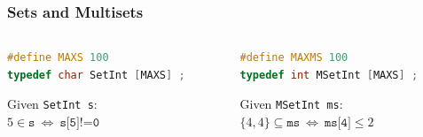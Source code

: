 \documentclass[aspectratio=169]{beamer}
\begin{document}
\begin{frame}[fragile]\frametitle{Sets and Multisets}
  
\begin{columns}
\begin{column}{.48\textwidth}
\begin{lstlisting}[language=C++,emph={SetInt,MSetInt}]
#define MAXS 100
typedef char SetInt [MAXS] ;
\end{lstlisting}

Given \texttt{SetInt s}:
\\$5 \in \texttt{s} ~\Leftrightarrow~ \texttt{s[5]!=0}$
\end{column}
\begin{column}{.48\textwidth}
\begin{lstlisting}[language=C++,emph={SetInt,MSetInt}]
#define MAXMS 100
typedef int MSetInt [MAXS] ;
\end{lstlisting}

Given \texttt{MSetInt ms}:
\\$\{4,4\} \subseteq \texttt{ms} ~\Leftrightarrow~ \texttt{ms[4]}\leq 2$
\end{column}
\end{columns}

\end{frame}
\end{document}
